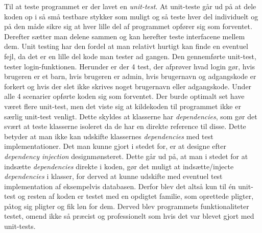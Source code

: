 Til at teste programmet er der lavet en \textit{unit-test}. At unit-teste går ud på at dele koden op i så små testbare stykker som muligt og så teste hver del individuelt og på den måde sikre sig at hver lille del af programmet opfører sig som forventet. Derefter sætter man delene sammen og kan herefter teste interfacene mellem dem.
Unit testing har den fordel at man relativt hurtigt kan finde en eventuel fejl, da det er en lille del kode man tester ad gangen. 
Den gennemførte unit-test, tester login-funktionen. Herunder er der 4 test, der afprøver hvad login gør, hvis brugeren er et barn, hvis brugeren er admin, hvis brugernavn og adgangskode er forkert og hvis der slet ikke skrives noget brugernavn eller adgangskode. Under alle 4 scenarier opførte koden sig som forventet. Der burde optimalt set have været flere unit-test, men det viste sig at kildekoden til programmet ikke er særlig unit-test venligt. Dette skyldes at klasserne har \textit{dependencies}, som gør det svært at teste klasserne isoleret da de har en direkte reference til disse. Dette betyder at man ikke kan udskifte klassernes \textit{dependencies} med test implementationer. Det man kunne gjort i stedet for, er at designe efter \textit{dependency injection} designmønsteret. Dette går ud på, at man i stedet for at indsætte \textit{dependencies} direkte i koden, gør det muligt at indsætte/injecte \textit{dependencies} i klasser, for derved at kunne udskifte med eventuel test implementation af eksempelvis databasen. 
Derfor blev det altså kun til én unit-test og resten af koden er testet med en opdigtet familie, som oprettede pligter, påtog sig pligter og fik løn for dem. Derved blev programmets funktionaliteter testet, omend ikke så præcist og professionelt som hvis det var blevet gjort med unit-tests. 

